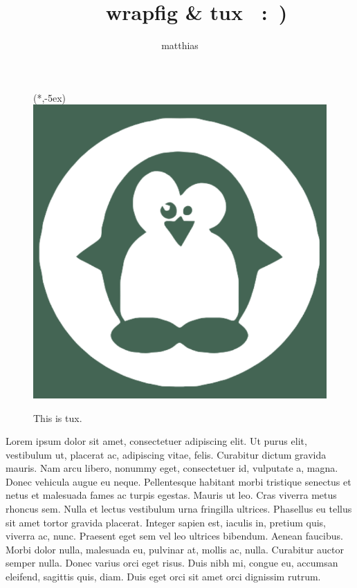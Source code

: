 \documentclass[a4paper]{article}
\title{\ \ \ wrapfig \& {\bf tux} \ :\ )}
\author{matthias}
\begin{document}
\maketitle

\begin{figure}
\xbox(*,-5ex){\includegraphics[width=\linewidth]{tux.png}}
\caption{\label{fig:frog1}This is tux.}
\end{figure}

Lorem ipsum dolor sit amet, consectetuer
  adipiscing elit. Ut purus elit, vestibulum ut, placerat ac, adipiscing vitae, felis. Curabitur dictum gravida mauris. Nam arcu libero, nonummy eget, consectetuer id, vulputate a, magna. Donec vehicula augue eu neque. Pellentesque habitant morbi tristique senectus et netus et malesuada fames ac turpis egestas. Mauris ut leo. Cras viverra metus rhoncus sem. Nulla et lectus vestibulum urna fringilla ultrices.  Phasellus eu tellus sit amet tortor gravida placerat. Integer sapien est, iaculis in, pretium quis, viverra ac, nunc. Praesent eget sem vel leo ultrices bibendum. Aenean faucibus.
  Morbi dolor nulla, malesuada eu, pulvinar at, mollis ac, nulla. Curabitur auctor semper nulla. Donec varius orci eget risus. Duis nibh mi, congue eu, accumsan eleifend, sagittis quis, diam. Duis eget orci sit amet orci dignissim rutrum.
\end{document}
